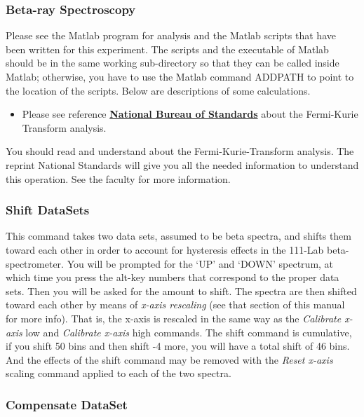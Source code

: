 \documentclass{../lab}
\begin{document}
\subsubsection{Beta-ray Spectroscopy}

Please see the Matlab program for analysis and the Matlab scripts that have been written for this experiment. The scripts and the executable of Matlab should be in the same working sub-directory so that they can be called inside Matlab; otherwise, you have to use the Matlab command ADDPATH to point to the location of the scripts. Below are descriptions of some calculations.

\begin{itemize}
    \item Please see reference \href{http://physics111.lib.berkeley.edu/Physics111/Reprints/BRA/04-Table\_for\_Analysis\_of\_Beta\_Spectra.pdf}{\textbf{National Bureau of Standards}} about the Fermi-Kurie Transform analysis.

\end{itemize}

You should read and understand about the Fermi-Kurie-Transform analysis. The reprint National Standards will give you all the needed information to understand this operation. See the faculty for more information.

\subsubsection{Shift DataSets}

This command takes two data sets, assumed to be beta spectra, and shifts them toward each other in order to account for hysteresis effects in the 111-Lab beta-spectrometer. You will be prompted for the `UP' and `DOWN' spectrum, at which time you press the alt-key numbers that correspond to the proper data sets. Then you will be asked for the amount to shift. The spectra are then shifted toward each other by means of \emph{x-axis rescaling} (see that section of this manual for more info). That is, the x-axis is rescaled in the same way as the \emph{Calibrate x-axis} low and \emph{Calibrate x-axis} high commands. The shift command is cumulative, if you shift 50 bins and then shift -4 more, you will have a total shift of 46 bins. And the effects of the shift command may be removed with the \emph{Reset x-axis} scaling command applied to each of the two spectra.

\subsubsection{Compensate DataSet}
\end{document}
